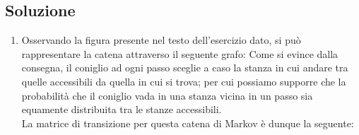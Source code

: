\documentclass[
	12pt, %
]{fphw}
\begin{document}
\subsection*{Soluzione}
	\begin{enumerate}
	\item Osservando la figura presente nel testo dell'esercizio dato, si può rappresentare la catena attraverso il seguente grafo:
	Come si evince dalla consegna, il coniglio ad ogni passo sceglie a caso la stanza in cui andare tra quelle accessibili da quella in cui si trova; per cui possiamo supporre che la probabilità che il coniglio vada in una stanza vicina in un passo sia equamente distribuita tra le stanze accessibili.\\
	La matrice di transizione per questa catena di Markov è dunque la seguente:
	

\end{enumerate}
\end{document}
